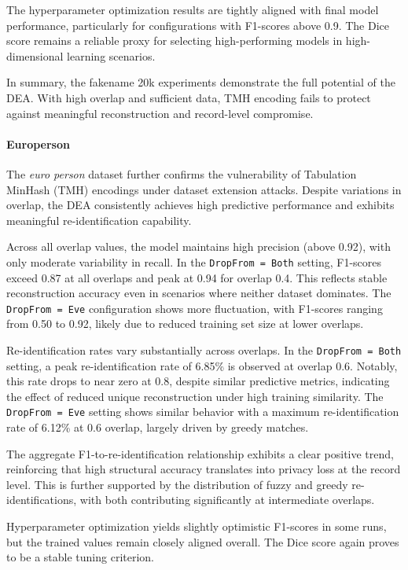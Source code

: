 The hyperparameter optimization results are tightly aligned with final model performance, particularly for configurations with F1-scores above 0.9. The Dice score remains a reliable proxy for selecting high-performing models in high-dimensional learning scenarios.

In summary, the fakename 20k experiments demonstrate the full potential of the DEA. With high overlap and sufficient data, TMH encoding fails to protect against meaningful reconstruction and record-level compromise.


\paragraph{Europerson}

The \textit{euro person} dataset further confirms the vulnerability of Tabulation MinHash (TMH) encodings under dataset extension attacks. Despite variations in overlap, the DEA consistently achieves high predictive performance and exhibits meaningful re-identification capability.

Across all overlap values, the model maintains high precision (above 0.92), with only moderate variability in recall. In the \texttt{DropFrom = Both} setting, F1-scores exceed 0.87 at all overlaps and peak at 0.94 for overlap 0.4. This reflects stable reconstruction accuracy even in scenarios where neither dataset dominates. The \texttt{DropFrom = Eve} configuration shows more fluctuation, with F1-scores ranging from 0.50 to 0.92, likely due to reduced training set size at lower overlaps.

Re-identification rates vary substantially across overlaps. In the \texttt{DropFrom = Both} setting, a peak re-identification rate of 6.85\% is observed at overlap 0.6. Notably, this rate drops to near zero at 0.8, despite similar predictive metrics, indicating the effect of reduced unique reconstruction under high training similarity. The \texttt{DropFrom = Eve} setting shows similar behavior with a maximum re-identification rate of 6.12\% at 0.6 overlap, largely driven by greedy matches.

The aggregate F1-to-re-identification relationship exhibits a clear positive trend, reinforcing that high structural accuracy translates into privacy loss at the record level. This is further supported by the distribution of fuzzy and greedy re-identifications, with both contributing significantly at intermediate overlaps.

Hyperparameter optimization yields slightly optimistic F1-scores in some runs, but the trained values remain closely aligned overall. The Dice score again proves to be a stable tuning criterion.

